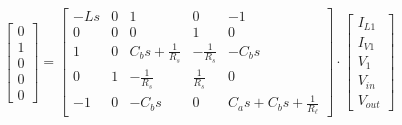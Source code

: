 \begin{equation}
\left[\begin{matrix}0\\1\\0\\0\\0\end{matrix}\right]=\left[\begin{matrix}- L s & 0 & 1 & 0 & -1\\0 & 0 & 0 & 1 & 0\\1 & 0 & C_{b} s + \frac{1}{R_{s}} & - \frac{1}{R_{s}} & - C_{b} s\\0 & 1 & - \frac{1}{R_{s}} & \frac{1}{R_{s}} & 0\\-1 & 0 & - C_{b} s & 0 & C_{a} s + C_{b} s + \frac{1}{R_{\ell}}\end{matrix}\right]\cdot \left[\begin{matrix}I_{L1}\\I_{V1}\\V_{1}\\V_{in}\\V_{out}\end{matrix}\right]
\end{equation}

